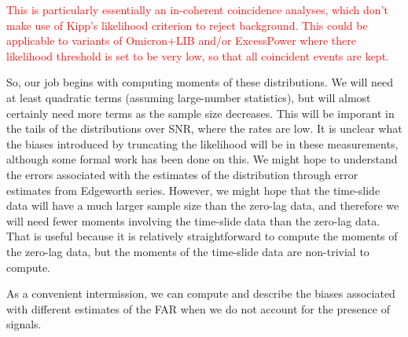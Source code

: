 \documentclass{article}
\begin{document}
\textcolor{red}{
This is particularly essentially an in-coherent coincidence analyses, which don't make use of Kipp's likelihood criterion to reject background. 
This could be applicable to variants of Omicron+LIB and/or ExcessPower where there likelihood threshold is set to be very low, so that all coincident events are kept.
}

So, our job begins with computing moments of these distributions.
We will need at least quadratic terms (assuming large-number statistics), but will almost certainly need more terms as the sample size decreases.
This will be imporant in the tails of the distributions over SNR, where the rates are low.
It is unclear what the biases introduced by truncating the likelihood will be in these measurements, although some formal work has been done on this. 
We might hope to understand the errors associated with the estimates of the distribution through error estimates from Edgeworth series.
However, we might hope that the time-slide data will have a much larger sample size than the zero-lag data, and therefore we will need fewer moments involving the time-slide data than the zero-lag data.
That is useful because it is relatively straightforward to compute the moments of the zero-lag data, but the moments of the time-slide data are non-trivial to compute.

As a convenient intermission, we can compute and describe the biases associated with different estimates of the FAR when we do not account for the presence of signals. 

\end{document}

